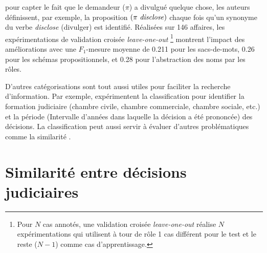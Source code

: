 pour capter le fait que le demandeur ($\pi$) a divulgué quelque chose, les auteurs définissent, par exemple, la proposition $(\pi\text{ \textit{disclose}})$ chaque fois qu'un synonyme du verbe \textit{disclose} (divulger) est identifié. Réalisées sur 146 affaires, les expérimentations de validation croisée \textit{leave-one-out} \footnote{
Pour $N$ cas annotés, une validation croisée \textit{leave-one-out} réalise $N$ expérimentations qui utilisent à tour de rôle 1 cas différent pour le test et le reste ($N-1$) comme cas d'apprentissage.}  montrent l'impact des améliorations avec une $F_1$-mesure moyenne de 0.211 pour les sacs-de-mots, 0.26 pour les schémas propositionnels, et 0.28 pour l'abstraction des noms par les rôles.

D'autres catégorisations sont tout aussi utiles pour faciliter la recherche d'information. Par exemple, \citet{Sulea2017predictareadecision,sulea2017legalEnsSVM} expérimentent la classification pour identifier la formation judiciaire (chambre civile, chambre commerciale, chambre sociale, etc.) et la période (Intervalle d'années dans laquelle la décision a été prononcée) des décisions. 
 La classification peut aussi servir à évaluer d'autres problématiques comme la similarité \citep{ma2018wmdchinesecase}.

\section{Similarité entre décisions judiciaires}

